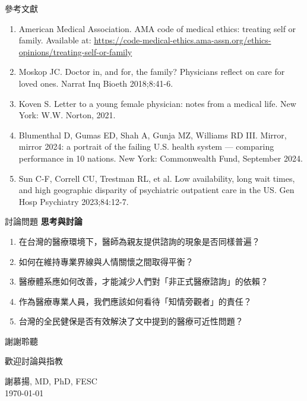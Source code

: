 \documentclass[aspectratio=169]{beamer}
\begin{document}
\begin{frame}{參考文獻}
\begin{enumerate}
\item American Medical Association. AMA code of medical ethics: treating self or family. Available at: \url{https://code-medical-ethics.ama-assn.org/ethics-opinions/treating-self-or-family}

\item Moskop JC. Doctor in, and for, the family? Physicians reflect on care for loved ones. Narrat Inq Bioeth 2018;8:41-6.

\item Koven S. Letter to a young female physician: notes from a medical life. New York: W.W. Norton, 2021.

\item Blumenthal D, Gumas ED, Shah A, Gunja MZ, Williams RD III. Mirror, mirror 2024: a portrait of the failing U.S. health system — comparing performance in 10 nations. New York: Commonwealth Fund, September 2024.

\item Sun C-F, Correll CU, Trestman RL, et al. Low availability, long wait times, and high geographic disparity of psychiatric outpatient care in the US. Gen Hosp Psychiatry 2023;84:12-7.
\end{enumerate}
\end{frame}

\begin{frame}{討論問題}
\textbf{\textcolor{medred}{思考與討論}}

\begin{enumerate}
\item 在台灣的醫療環境下，醫師為親友提供諮詢的現象是否同樣普遍？

\item 如何在維持專業界線與人情關懷之間取得平衡？

\item 醫療體系應如何改善，才能減少人們對「非正式醫療諮詢」的依賴？

\item 作為醫療專業人員，我們應該如何看待「知情旁觀者」的責任？

\item 台灣的全民健保是否有效解決了文中提到的醫療可近性問題？
\end{enumerate}
\end{frame}

\begin{frame}[plain]
\vfill
\centering
\Huge \textcolor{medred}{謝謝聆聽}

\vspace{1cm}

\Large \textcolor{medblue}{歡迎討論與指教}

\vspace{0.5cm}

\normalsize
謝慕揚, MD, PhD, FESC\\
\today
\vfill
\end{frame}
\end{document}
